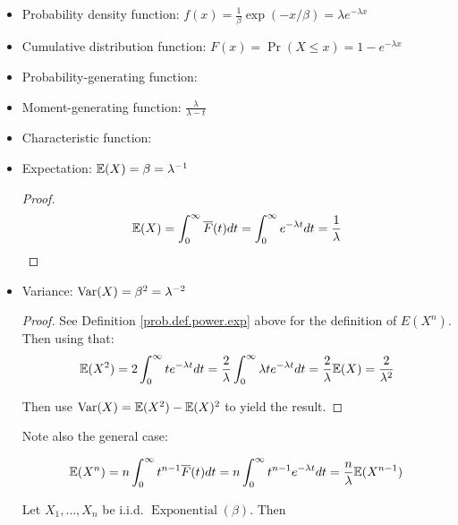 \begin{itemize}

\item Probability density function: \(f(x) = \frac{1}{\beta} \exp(-x/\beta) = \lambda e^{- \lambda x} \)

\item Cumulative distribution function: \(F(x) = \Pr(X \leq x) = 1 - e^{-\lambda x}\)

\item Probability-generating function:

\item Moment-generating function: \(\frac{\lambda}{\lambda - t}\)

\item Characteristic function:

\item Expectation: \(\mathbb{E}(X) = \beta = \lambda^{-1} \)

\begin{proof}

\[
 \mathbb{E}(X) = \int_0^\infty \overline{F}(t)dt = \int_0^\infty e^{-\lambda t} dt = \frac{1}{\lambda}
 \]

\end{proof}

\item Variance: \(\mathrm{Var}(X) = \beta^2 = \lambda^{-2}  \)

\begin{proof} See Definition \ref{prob.def.power.exp} above for the definition of \(E(X^n)\). Then using that:
\[
\mathbb{E}(X^2) = 2 \int_0^\infty t e^{-\lambda t} dt = \frac{2}{\lambda} \int_0^\infty \lambda t e^{-\lambda t} dt = \frac{2}{\lambda} \mathbb{E}(X) = \frac{2}{\lambda^2}
\]

Then use \(\mathrm{Var}(X) = \mathbb{E}(X^2) - \mathbb{E}(X)^2\) to yield the result. 
\end{proof}

\begin{remark} Note also the general case:

\[
\mathbb{E}(X^n) = n \int_0^\infty t^{n-1} \overline{F}(t) dt = n \int_0^\infty t^{n-1} e^{-\lambda t} dt = \frac{n}{\lambda} \mathbb{E}(X^{n-1})
\]

\end{remark}

\begin{corollary}\label{prob.gammasum.cor.exp}

Let \(X_1, \ldots, X_n\) be i.i.d. \(\operatorname{Exponential}(\beta)\). Then 


\end{corollary}
\end{itemize}

